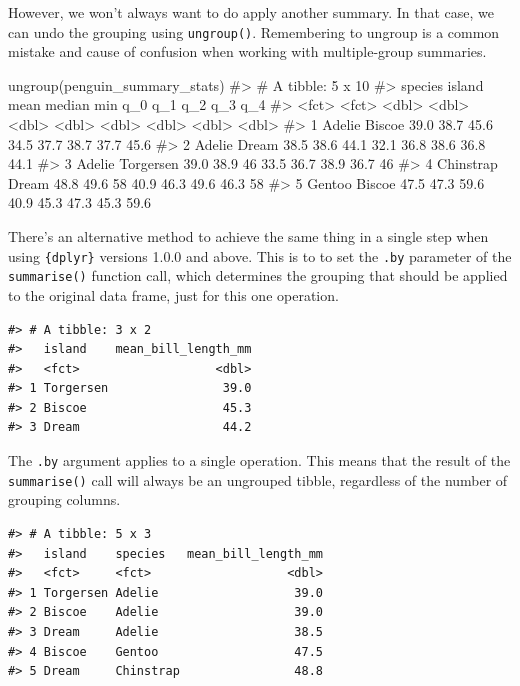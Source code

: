 \documentclass[
  letterpaper,
  DIV=11,
  numbers=noendperiod]{scrreprt}
\newenvironment{Shaded}{\begin{snugshade}}{\end{snugshade}}
\newcommand{\CommentTok}[1]{\textcolor[rgb]{0.37,0.37,0.37}{#1}}
\newcommand{\FunctionTok}[1]{\textcolor[rgb]{0.28,0.35,0.67}{#1}}
\newcommand{\NormalTok}[1]{\textcolor[rgb]{0.00,0.23,0.31}{#1}}
\begin{document}
However, we won't always want to do apply another summary. In that case,
we can undo the grouping using \texttt{ungroup()}. Remembering to
ungroup is a common mistake and cause of confusion when working with
multiple-group summaries.

\begin{Shaded}
\begin{Highlighting}[]
\FunctionTok{ungroup}\NormalTok{(penguin\_summary\_stats)}
\CommentTok{\#\textgreater{} \# A tibble: 5 x 10}
\CommentTok{\#\textgreater{}   species   island     mean median   min   q\_0   q\_1   q\_2   q\_3   q\_4}
\CommentTok{\#\textgreater{}   \textless{}fct\textgreater{}     \textless{}fct\textgreater{}     \textless{}dbl\textgreater{}  \textless{}dbl\textgreater{} \textless{}dbl\textgreater{} \textless{}dbl\textgreater{} \textless{}dbl\textgreater{} \textless{}dbl\textgreater{} \textless{}dbl\textgreater{} \textless{}dbl\textgreater{}}
\CommentTok{\#\textgreater{} 1 Adelie    Biscoe     39.0   38.7  45.6  34.5  37.7  38.7  37.7  45.6}
\CommentTok{\#\textgreater{} 2 Adelie    Dream      38.5   38.6  44.1  32.1  36.8  38.6  36.8  44.1}
\CommentTok{\#\textgreater{} 3 Adelie    Torgersen  39.0   38.9  46    33.5  36.7  38.9  36.7  46  }
\CommentTok{\#\textgreater{} 4 Chinstrap Dream      48.8   49.6  58    40.9  46.3  49.6  46.3  58  }
\CommentTok{\#\textgreater{} 5 Gentoo    Biscoe     47.5   47.3  59.6  40.9  45.3  47.3  45.3  59.6}
\end{Highlighting}
\end{Shaded}

There's an alternative method to achieve the same thing in a single step
when using \texttt{\{dplyr\}} versions 1.0.0 and above. This is to to
set the \texttt{.by} parameter of the \texttt{summarise()} function
call, which determines the grouping that should be applied to the
original data frame, just for this one operation.

\begin{verbatim}
#> # A tibble: 3 x 2
#>   island    mean_bill_length_mm
#>   <fct>                   <dbl>
#> 1 Torgersen                39.0
#> 2 Biscoe                   45.3
#> 3 Dream                    44.2
\end{verbatim}

The \texttt{.by} argument applies to a single operation. This means that
the result of the \texttt{summarise()} call will always be an ungrouped
tibble, regardless of the number of grouping columns.

\begin{verbatim}
#> # A tibble: 5 x 3
#>   island    species   mean_bill_length_mm
#>   <fct>     <fct>                   <dbl>
#> 1 Torgersen Adelie                   39.0
#> 2 Biscoe    Adelie                   39.0
#> 3 Dream     Adelie                   38.5
#> 4 Biscoe    Gentoo                   47.5
#> 5 Dream     Chinstrap                48.8
\end{verbatim}
\end{document}
